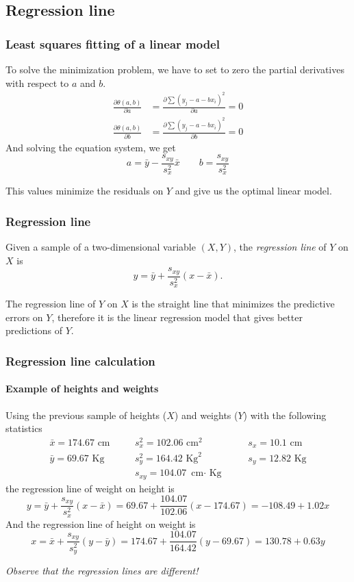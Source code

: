 \subsection{Regression line}
\begin{frame}
\frametitle{Least squares fitting of a linear model}
To solve the minimization problem, we have to set to zero the partial derivatives with respect to $a$ and $b$.  
\begin{align*}
\frac{\partial \theta(a,b)}{\partial a} &=  \frac{\partial \sum (y_j-a-bx_i)^2 }{\partial a} =0\\
\frac{\partial \theta(a,b)}{\partial b} &=  \frac{\partial \sum (y_j-a-bx_i)^2 }{\partial b} =0
\end{align*}
And solving the equation system, we get
\[
a= \bar y - \frac{s_{xy}}{s_x^2}\bar x \qquad b=\frac{s_{xy}}{s_x^2}
\]

This values minimize the residuals on $Y$ and give us the optimal linear model.
\end{frame}


\begin{frame}
\frametitle{Regression line}
\begin{definition}
Given a sample of a two-dimensional variable $(X,Y)$, the \emph{regression line} of $Y$ on $X$ is
\[
y = \bar y +\frac{s_{xy}}{s_x^2}(x-\bar x).
\]
\end{definition}

The regression line of $Y$ on $X$ is the straight line that minimizes the predictive errors on $Y$, therefore it is the linear regression model that gives better predictions of $Y$.
\end{frame}


\begin{frame}
\frametitle{Regression line calculation}
\framesubtitle{Example of heights and weights}
Using the previous sample of heights ($X$) and weights ($Y$) with the following statistics
\[
\begin{array}{lllll}
\bar x = 174.67 \mbox{ cm} & \quad & s^2_x = 102.06 \mbox{ cm}^2 & \quad & s_x = 10.1 \mbox{ cm}\\
\bar y = 69.67 \mbox{ Kg} & & s^2_y = 164.42 \mbox{ Kg}^2 & & s_y = 12.82 \mbox{ Kg}\\
& & s_{xy} = 104.07 \mbox{ cm$\cdot$ Kg} & &
\end{array}
\]
the regression line of weight on height is  
\[
y = \bar y +\frac{s_{xy}}{s_x^2}(x-\bar x) = 69.67+\frac{104.07}{102.06}(x-174.67) = -108.49 +1.02 x
\]
And the regression line of height on weight is 
\[
x = \bar x +\frac{s_{xy}}{s_y^2}(y-\bar y) = 174.67+\frac{104.07}{164.42}(y-69.67) = 130.78 + 0.63 y
\]
\begin{center}
\emph{Observe that the regression lines are different!}
\end{center}
\end{frame}


